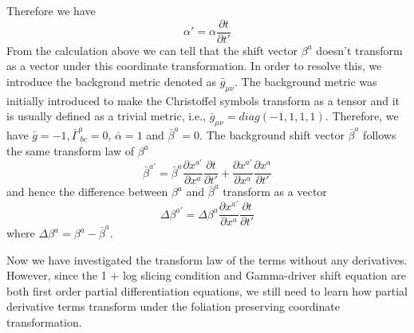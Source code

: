 \documentclass[letterpaper,nofootinbib,prd,amsmath,onecolumn]{revtex4-1}
\begin{document}
Therefore we have
\begin{equation}
\alpha' = \alpha\frac{\partial t}{\partial t'}\label{lapse transform}
\end{equation}
From the calculation above we can tell that the shift vector $\beta^{a}$ doesn't transform as a vector under this coordinate transformation. In order to resolve this, we introduce the backgrond metric denoted as ${\bar g}_{\mu\nu}$. The background metric was initially introduced to make the Christoffel symbols transform as a tensor and it is usually defined as a trivial metric, i.e., ${\bar g}_{\mu\nu} = diag(-1,1,1,1)$. Therefore, we have ${\bar g} = -1, $${\bar \Gamma}^{a}_{~bc} = 0$, ${\bar \alpha} = 1$ and ${\bar \beta}^{a} = 0$. The background shift vector ${\bar \beta}^{a}$ follows the same transform law of $\beta^{a}$
\[
{\bar \beta}^{a'} = {\bar \beta}^{a}\frac{\partial x^{a'}}{\partial x^{a}}\frac{\partial t}{\partial t'} + \frac{\partial x^{a'}}{\partial x^{a}}\frac{\partial x^{a}}{\partial t'}
\]
and hence the difference between $\beta^{a}$ and ${\bar \beta}^{a}$ transform as a vector
\begin{equation}
\Delta \beta^{a'} = \Delta \beta^{a}\frac{\partial x^{a'}}{\partial x^{a}}\frac{\partial t}{\partial t'}
\end{equation}
where $\Delta \beta^{a} = \beta^{a} - {\bar \beta}^{a}$.
 
Now we have investigated the transform law of the terms without any derivatives. However, since the 1 + log slicing condition and Gamma-driver shift equation are both first order partial differentiation equations, we still need to learn how partial derivative terms transform under the foliation preserving coordinate transformation. 
\end{document}
